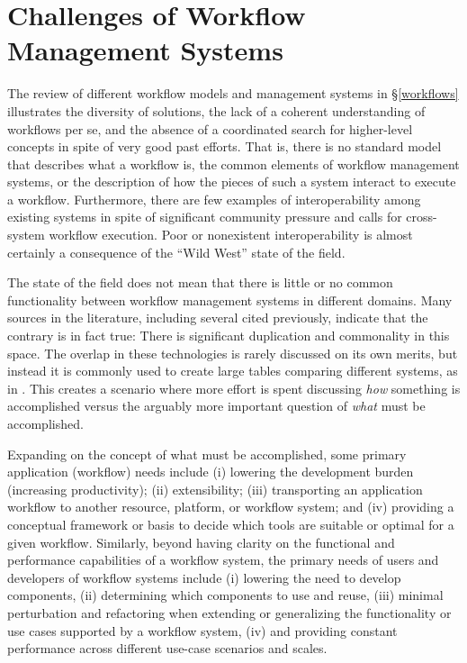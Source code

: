 
\section{Challenges of Workflow Management Systems}\label{commonFunc}

The review of different workflow models and management systems in
\S\ref{workflows} illustrates the diversity of solutions, the lack of a coherent
understanding of workflows per se, and the absence of a coordinated search for
higher-level concepts in spite of very good past efforts. That is, there is no
standard model that describes what a workflow is, the common elements of
workflow management systems, or the description of how the pieces of such a
system interact to execute a workflow. Furthermore, there are few examples of
interoperability among existing systems in spite of significant community
pressure and calls for cross-system workflow execution. Poor or nonexistent
interoperability is almost certainly a consequence of the ``Wild West'' state of
the field.

The state of the field does not mean that there is little or no common
functionality between workflow management systems in different domains. Many
sources in the literature, including several cited previously, indicate
that the contrary is in fact true: There is significant duplication and
commonality in this space. The overlap in these technologies is rarely discussed
on its own merits, but instead it is commonly used to create large tables
comparing different systems, as in
\cite{ferreira_da_silva_characterization_nodate}. This creates a scenario where
more effort is spent discussing \textit{how} something is accomplished
versus the arguably more important question of \textit{what} must be
accomplished. 

Expanding on the concept of what must be accomplished, some primary application
(workflow) needs include (i) lowering the development burden (increasing
productivity); (ii) extensibility; (iii) transporting an application workflow
to another resource, platform, or workflow system; and (iv) providing a
conceptual framework or basis to decide which tools are suitable or optimal for
a given workflow. Similarly, beyond having clarity on the functional and
performance capabilities of a workflow system, the primary needs of users and
developers of workflow systems include (i) lowering the need to develop
components, (ii) determining which components to use and reuse, (iii) minimal
perturbation and refactoring when extending or generalizing the functionality
or use cases supported by a workflow system, (iv) and providing constant
performance across different use-case scenarios and scales.


